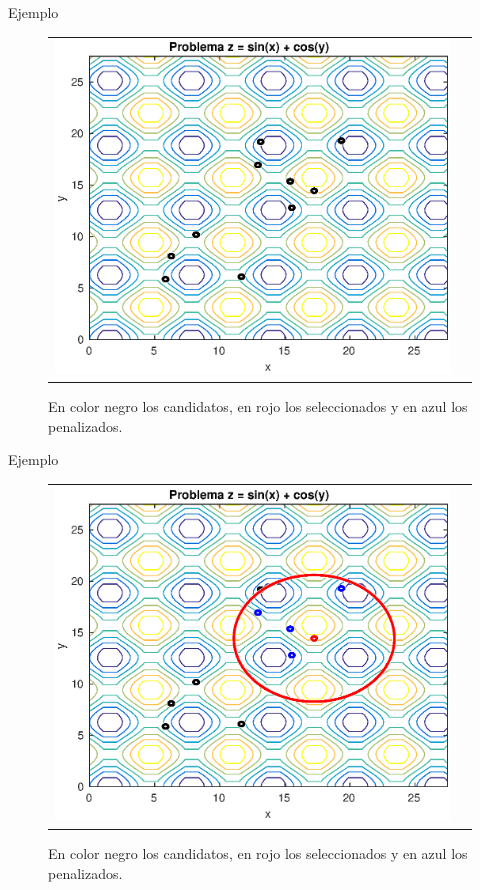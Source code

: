 \documentclass{beamer}
\begin{document}
\begin{frame}{Ejemplo}
\begin{figure}[H]
  \centering
  \begin{tabular}{c c}
   \includegraphics[scale=0.6]{Images/1.eps} 
  \end{tabular}
  \caption{\scriptsize En color negro los candidatos, en rojo los seleccionados y en azul los penalizados.}
\end{figure}
\end{frame}


\begin{frame}{Ejemplo}
\begin{figure}[H]
  \centering
  \begin{tabular}{c c}
   \includegraphics[scale=0.6]{Images/2.eps} 
  \end{tabular}
  \caption{\scriptsize En color negro los candidatos, en rojo los seleccionados y en azul los penalizados.}
\end{figure}
\end{frame}
\end{document}
